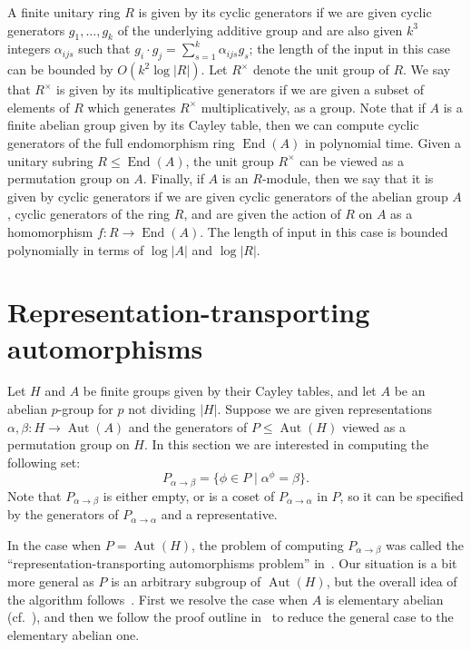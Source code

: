 \documentclass{article}
\DeclareMathOperator{\Aut}{Aut}
\DeclareMathOperator{\End}{End}
\begin{document}
A finite unitary ring \( R \) is given by its cyclic generators if we are given cyclic generators \( g_1, \dots, g_k \) of the underlying
additive group and are also given \( k^3 \) integers \( \alpha_{ijs} \) such that \( g_i \cdot g_j = \sum_{s=1}^k \alpha_{ijs} g_s \);
the length of the input in this case can be bounded by \( O(k^2 \log |R|) \). Let \( R^\times \) denote the unit group of \( R \). We say that \( R^\times \)
is given by its multiplicative generators if we are given a subset of elements of \( R \) which generates \( R^\times \) multiplicatively, as a group.
Note that if \( A \) is a finite abelian group given by its Cayley table, then we can compute cyclic generators of the full endomorphism ring \( \End(A) \)
in polynomial time. Given a unitary subring \( R \leq \End(A) \), the unit group \( R^\times \) can be viewed as a permutation group on \( A \).
Finally, if \( A \) is an \( R \)-module, then we say that it is given by cyclic generators if we are given cyclic generators of the abelian group \( A \),
cyclic generators of the ring \( R \), and are given the action of \( R \) on \( A \) as a homomorphism
\( f : R \to \End(A) \). The length of input in this case is bounded polynomially in terms of \( \log |A| \) and \( \log |R| \).

\section{Representation-transporting automorphisms}\label{secRtp}

Let \( H \) and \( A \) be finite groups given by their Cayley tables, and let \( A \) be an abelian \( p \)-group
for \( p \) not dividing \( |H| \). Suppose we are given representations \( \alpha, \beta : H \to \Aut(A) \)
and the generators of \( P \leq \Aut(H) \) viewed as a permutation group on \( H \). In this section we are interested in computing the following set:
\[ P_{\alpha \to \beta} = \{ \phi \in P \mid \alpha^\phi = \beta \}. \]
Note that \( P_{\alpha \to \beta} \) is either empty, or is a coset of \( P_{\alpha \to \alpha} \) in \( P \), so it can be specified
by the generators of \( P_{\alpha \to \alpha} \) and a representative.

In the case when \( P = \Aut(H) \), the problem of computing \( P_{\alpha \to \beta} \) was called the
``representation-transporting automorphisms problem'' in~\cite[Problem~2]{absyl}.
Our situation is a bit more general as \( P \) is an arbitrary subgroup of \( \Aut(H) \), but the overall idea
of the algorithm follows~\cite[Sections~5 and~6]{absyl}. First we resolve the case when \( A \) is elementary abelian (cf.~\cite[Section~5]{absyl}),
and then we follow the proof outline in~\cite[Section~6]{absyl} to reduce the general case to the elementary abelian one.
\end{document}
